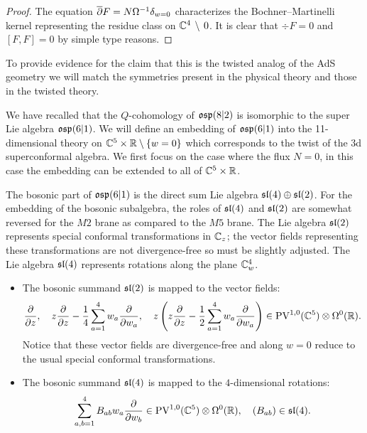 \begin{proof}
The equation $\overline{\partial} F = N \Omega^{-1} \delta_{w=0}$ characterizes the Bochner--Martinelli kernel representing the residue class on $\mathbb C^4 \, \setminus \, 0$. 
It is clear that $\div F = 0$ and $[F, F] = 0$ by simple type reasons. 
\end{proof}

\parsec[]

To provide evidence for the claim that this is the twisted analog of the AdS geometry we will match the symmetries present in the physical theory and those in the twisted theory. 

We have recalled that the $Q$-cohomology of $\mathfrak{osp}(8|2)$ is isomorphic to the super Lie algebra $\mathfrak{osp}(6|1)$. 
We will define an embedding of $\mathfrak{osp}(6|1)$ into the 11-dimensional theory on $\mathbb C^5 \times \mathbb R \setminus \{w=0\}$ which corresponds to the twist of the 3d superconformal algebra.
We first focus on the case where the flux $N=0$, in this case the embedding can be extended to all of $\mathbb C^5 \times \mathbb R$. 

\parsec[] 

The bosonic part of $\mathfrak{osp}(6|1)$ is the direct sum Lie algebra $\mathfrak{sl}(4) \oplus \mathfrak{sl}(2)$. 
For the embedding of the bosonic subalgebra, the roles of $\mathfrak{sl}(4)$ and $\mathfrak{sl}(2)$ are somewhat reversed for the $M2$ brane as compared to the $M5$ brane. 
The Lie algebra $\mathfrak{sl}(2)$ represents special conformal transformations in $\mathbb C_z$; the vector fields representing these transformations are not divergence-free so must be slightly adjusted. 
The Lie algebra $\mathfrak{sl}(4)$ represents rotations along the plane $\mathbb C^4_w$.   

\begin{itemize}
\item The bosonic summand $\mathfrak{sl}(2)$ is mapped to the vector fields:
\[
\frac{\partial}{\partial z} ,\quad z \frac{\partial}{\partial z} - \frac14 \sum_{a=1}^4 w_a \frac{\partial}{\partial w_a} , \quad z \left(z \frac{\partial}{\partial z} - \frac12 \sum_{a=1}^4 w_a \frac{\partial}{\partial w_a} \right) \in {\rm PV}^{1,0}(\mathbb C^5) \otimes \Omega^0(\mathbb R) .
\]
Notice that these vector fields are divergence-free and along $w=0$ reduce to the usual special conformal transformations.
\item The bosonic summand $\mathfrak{sl}(4)$ is mapped to the $4$-dimensional rotations: 
\[
\sum_{a,b=1}^4 B_{ab} w_a \frac{\partial}{\partial w_b} \in {\rm PV}^{1,0}(\mathbb C^5) \otimes \Omega^0(\mathbb R) , \quad (B_{ab}) \in \mathfrak{sl}(4) .
\]
\end{itemize}

